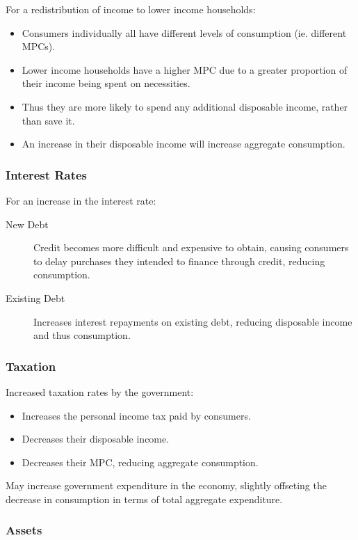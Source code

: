 \documentclass[a4paper,11pt]{article}
\begin{document}
For a redistribution of income to lower income households:

\begin{itemize}
\item Consumers individually all have different levels of consumption (ie.
	different MPCs).
\item Lower income households have a higher MPC due to a greater proportion of
	their income being spent on necessities.
\item Thus they are more likely to spend any additional disposable income,
	rather than save it.
\item An increase in their disposable income will increase aggregate
	consumption.
\end{itemize}


\subsubsection{Interest Rates}

For an increase in the interest rate:

\begin{description}
\item [New Debt] Credit becomes more difficult and expensive to obtain, causing
	consumers to delay purchases they intended to finance through credit,
	reducing consumption.
\item [Existing Debt] Increases interest repayments on existing debt, reducing
	disposable income and thus consumption.
\end{description}


\subsubsection{Taxation}

Increased taxation rates by the government:

\begin{itemize}
\item Increases the personal income tax paid by consumers.
\item Decreases their disposable income.
\item Decreases their MPC, reducing aggregate consumption.
\end{itemize}

May increase government expenditure in the economy, slightly offseting the
decrease in consumption in terms of total aggregate expenditure.


\subsubsection{Assets}
\end{document}
